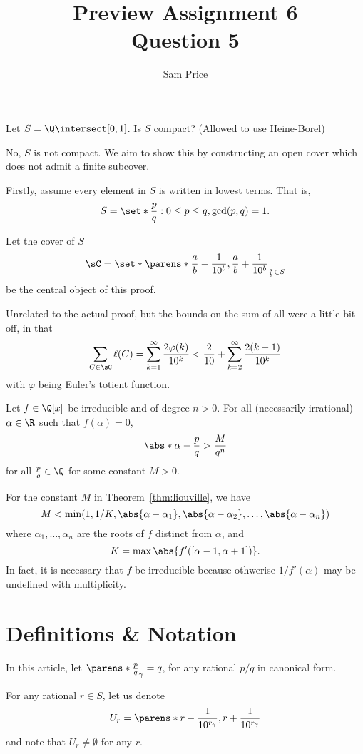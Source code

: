\documentclass{article}
\author{Sam Price}
\date{}
\title{Preview Assignment 6\\\Large{Question 5}}
\newcommand{\Rt}[1]{\dfrac{1}{10^{#1}}}
\begin{document}
\maketitle

Let $S = \Q \intersect [0, 1]$. Is $S$ compact? (Allowed to use Heine-Borel)
\vspace{0.5cm}

No, $S$ is not compact. We aim to show this by constructing an open cover which does not admit a finite subcover.

Firstly, assume every element in $S$ is written in lowest terms. That is,
\[ S = \set*{\frac{p}{q} : 0 \le p \le q, \gcd(p, q) = 1 }. \]

Let the cover of $S$
\[ \sC = \set*{\parens*{\frac{a}{b} - \Rt{b}, \frac{a}{b} + \Rt{b}}}_{\frac{a}{b} \in S} \]
be the central object of this proof.

Unrelated to the actual proof, but the bounds on the sum of all were a little bit off, in that
\[
  \sum_{C \in \sC} \ell(C) = \sum_{k = 1}^{\infty}\frac{2\varphi(k)}{10^{k}}
  < \frac{2}{10} + \sum_{k = 2}^{\infty}\frac{2(k - 1)}{10^{k}}
\]
with $\varphi$ being Euler's totient function.

\begin{thm}\label{thm:liouville}
  Let $f \in \Q[x]$ be irreducible and of degree $n > 0$. For all (necessarily irrational) $\alpha \in \R$ such that $f(\alpha) = 0$,
  \[ \abs*{\alpha - \frac{p}{q}} > \frac{M}{q^{n}} \]
  for all $\frac{p}{q} \in \Q$ for some constant $M > 0$.
\end{thm}
\begin{remark}
  For the constant $M$ in Theorem~\ref{thm:liouville}, we have
  \[ M < \min(1, 1/K, \abs{\alpha - \alpha_{1}}, \abs{\alpha - \alpha_{2}}, \ldots, \abs{\alpha - \alpha_{n}}) \]
  where $\alpha_{1}, \ldots, \alpha_{n}$ are the roots of $f$ distinct from $\alpha$, and
  \[ K = \max \abs{f'([\alpha - 1, \alpha + 1])}. \]
  In fact, it is necessary that $f$ be irreducible because othwerise $1/f'(\alpha)$ may be undefined with multiplicity.
\end{remark}

\section{Definitions \& Notation}
In this article, let $\parens*{\frac{p}{q}}_{\gamma} = q$, for any rational $p/q$ in canonical form.

For any rational $r \in S$, let us denote
\[ U_{r} = \parens*{r - \Rt{r_{\gamma}}, r + \Rt{r_{\gamma}}} \]
and note that $U_{r} \ne \emptyset$ for any $r$.
\end{document}

